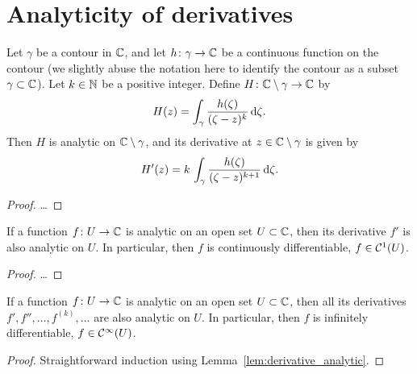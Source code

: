 \section{Analyticity of derivatives}

\begin{lemma}
  \label{lem:derivative_auxiliary_integral}
  Let $\gamma$ be a contour in $\mathbb{C}$, and let $h \colon \gamma \to \mathbb{C}$
  be a continuous function on the contour (we slightly abuse the notation
  here to identify the contour as a subset $\gamma \subset \mathbb{C}$).
  Let $k \in \mathbb{N}$ be a positive integer.
  Define $H \colon \mathbb{C} \setminus \gamma \to \mathbb{C}$ by
  \begin{align*}
    H(z) = \int_\gamma \frac{h(\zeta)}{(\zeta - z)^{k}} \, \mathrm{d} \zeta .
  \end{align*}
  Then $H$ is analytic on $\mathbb{C} \setminus \gamma$, and its derivative
  at $z \in \mathbb{C} \setminus \gamma$ is given by
  \begin{align*}
    H'(z) = k \, \int_\gamma \frac{h(\zeta)}{(\zeta - z)^{k+1}} \, \mathrm{d} \zeta .
  \end{align*}
\end{lemma}
\begin{proof}
  \ldots
\end{proof}

\begin{lemma}
  \label{lem:derivative_analytic}
  If a function $f \colon U \to \mathbb{C}$ is analytic on an open set $U \subset \mathbb{C}$,
  then its derivative $f'$ is also analytic on $U$.
  In particular, then $f$ is continuously differentiable,
  $f \in \mathcal{C}^{{1}}(U)$.
\end{lemma}
\begin{proof}
  \ldots
\end{proof}

\begin{corollary}
  \label{lem:higher_derivatives_analytic}
  If a function $f \colon U \to \mathbb{C}$ is analytic on an open set $U \subset \mathbb{C}$,
  then all its derivatives $f', f'', \ldots, f^{(k)}, \ldots$ are also analytic on $U$.
  In particular, then $f$ is infinitely differentiable,
  $f \in \mathcal{C}^{{\infty}}(U)$.
\end{corollary}
\begin{proof}
  Straightforward induction using Lemma~\ref{lem:derivative_analytic}.
\end{proof}

